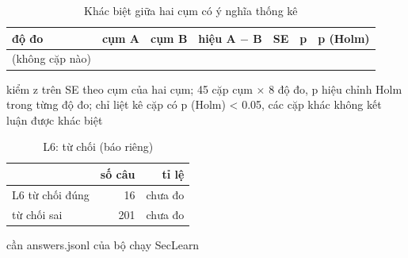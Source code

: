 \begin{table}[ht]
\centering
\caption{Khác biệt giữa hai cụm có ý nghĩa thống kê}
\begin{tabular}{lrrrrrr}
\toprule
độ đo & cụm A & cụm B & hiệu A $-$ B & SE & p & p (Holm) \\
\midrule
(không cặp nào) &  &  &  &  &  &  \\
\bottomrule
\end{tabular}
\par\smallskip\footnotesize kiểm z trên SE theo cụm của hai cụm; 45 cặp cụm × 8 độ đo, p hiệu chỉnh Holm trong từng độ đo; chỉ liệt kê cặp có p (Holm) < 0.05, các cặp khác không kết luận được khác biệt
\end{table}

\begin{table}[ht]
\centering
\caption{L6: từ chối (báo riêng)}
\begin{tabular}{lrr}
\toprule
 & số câu & tỉ lệ \\
\midrule
L6 từ chối đúng & 16 & chưa đo \\
từ chối sai & 201 & chưa đo \\
\bottomrule
\end{tabular}
\par\smallskip\footnotesize cần answers.jsonl của bộ chạy SecLearn
\end{table}
